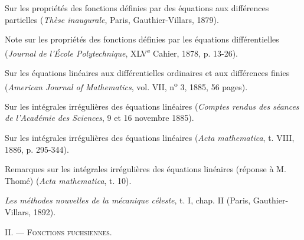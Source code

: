 \documentclass[11pt]{article}
\begin{document}
\begin{description}[leftmargin=3.4em,labelwidth=2.8em,style=nextline]
\item[64.] Sur les propriétés des fonctions définies par des équations aux différences partielles (\emph{Thèse inaugurale}, Paris, Gauthier-Villars, 1879).
\item[78.] Note sur les propriétés des fonctions définies par les équations différentielles (\emph{Journal de l’École Polytechnique}, XLV\textsuperscript{e} Cahier, 1878, p. 13-26).
\item[83.] Sur les équations linéaires aux différentielles ordinaires et aux différences finies (\emph{American Journal of Mathematics}, vol. VII, n\textsuperscript{o} 3, 1885, 56 pages).
\item[57.] Sur les intégrales irrégulières des équations linéaires (\emph{Comptes rendus des séances de l’Académie des Sciences}, 9 et 16 novembre 1885).
\item[73.] Sur les intégrales irrégulières des équations linéaires (\emph{Acta mathematica}, t. VIII, 1886, p. 295-344).
\item[182.] Remarques sur les intégrales irrégulières des équations linéaires (réponse à M. Thomé) (\emph{Acta mathematica}, t. 10).
\item[278.] \emph{Les méthodes nouvelles de la mécanique céleste}, t. I, chap. II (Paris, Gauthier-Villars, 1892).
\end{description}

\begin{center}
{\scshape II. — Fonctions fuchsiennes.}
\end{center}
\end{document}
